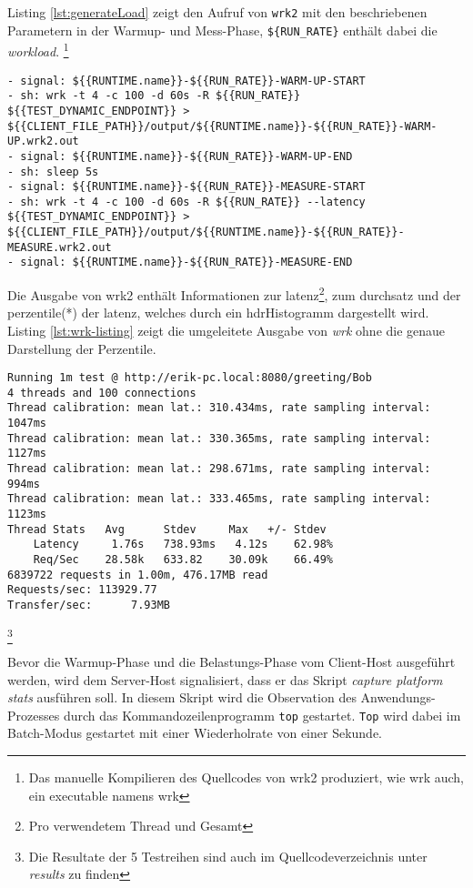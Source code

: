 Listing \ref*{lst:generateLoad} zeigt den Aufruf von \verb|wrk2| mit den beschriebenen Parametern in der Warmup- und Mess-Phase,
\verb|${RUN_RATE}| enthält dabei die \textit{workload}.
\footnote{Das manuelle Kompilieren des Quellcodes von wrk2 produziert, wie wrk auch, ein executable namens wrk}

\begin{lstlisting}[caption=Auszug des qDup Skripts generate load, captionpos=b, label=lst:generateLoad]
- signal: ${{RUNTIME.name}}-${{RUN_RATE}}-WARM-UP-START
- sh: wrk -t 4 -c 100 -d 60s -R ${{RUN_RATE}} ${{TEST_DYNAMIC_ENDPOINT}} > ${{CLIENT_FILE_PATH}}/output/${{RUNTIME.name}}-${{RUN_RATE}}-WARM-UP.wrk2.out
- signal: ${{RUNTIME.name}}-${{RUN_RATE}}-WARM-UP-END
- sh: sleep 5s
- signal: ${{RUNTIME.name}}-${{RUN_RATE}}-MEASURE-START
- sh: wrk -t 4 -c 100 -d 60s -R ${{RUN_RATE}} --latency ${{TEST_DYNAMIC_ENDPOINT}} > ${{CLIENT_FILE_PATH}}/output/${{RUNTIME.name}}-${{RUN_RATE}}-MEASURE.wrk2.out
- signal: ${{RUNTIME.name}}-${{RUN_RATE}}-MEASURE-END
   \end{lstlisting}

Die Ausgabe von wrk2 enthält Informationen zur \Gls{latenz}\footnote{Pro verwendetem Thread und Gesamt},
zum \Gls{durchsatz} und der \Gls{perzentile}(*) der \Gls{latenz}, welches durch ein \Gls{hdrHistogramm} dargestellt wird.
Listing \ref*{lst:wrk-listing} zeigt die umgeleitete Ausgabe von \textit{wrk} ohne die genaue Darstellung der Perzentile.

\begin{lstlisting}[caption=Beispiel für Ausgabe von wrk,captionpos=b, label=lst:wrk-listing]
Running 1m test @ http://erik-pc.local:8080/greeting/Bob
4 threads and 100 connections
Thread calibration: mean lat.: 310.434ms, rate sampling interval: 1047ms
Thread calibration: mean lat.: 330.365ms, rate sampling interval: 1127ms
Thread calibration: mean lat.: 298.671ms, rate sampling interval: 994ms
Thread calibration: mean lat.: 333.465ms, rate sampling interval: 1123ms
Thread Stats   Avg      Stdev     Max   +/- Stdev
	Latency     1.76s   738.93ms   4.12s    62.98%
	Req/Sec    28.58k   633.82    30.09k    66.49%
6839722 requests in 1.00m, 476.17MB read
Requests/sec: 113929.77
Transfer/sec:      7.93MB
\end{lstlisting}\footnote{Die Resultate der 5 Testreihen sind auch im Quellcodeverzeichnis unter \textit{\/results} zu finden}

Bevor die Warmup-Phase und die Belastungs-Phase vom Client-Host ausgeführt werden, wird dem Server-Host signalisiert, dass
er das Skript \textit{capture platform stats} ausführen soll.
In diesem Skript wird die Observation des Anwendungs-Prozesses durch das Kommandozeilenprogramm \verb|top| gestartet.
\verb|Top| wird dabei im Batch-Modus gestartet mit einer Wiederholrate von einer Sekunde.

